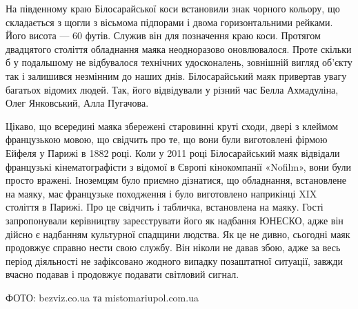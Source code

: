 На південному краю Білосарайської коси встановили знак чорного кольору, що
складається з щогли з вісьмома підпорами і двома горизонтальними рейками. Його
висота — 60 футів. Служив він для позначення краю коси. Протягом двадцятого
століття обладнання маяка неодноразово оновлювалося. Проте скільки б у
подальшому не відбувалося технічних удосконалень, зовнішній вигляд об'єкту так
і залишився незмінним до наших днів. Білосарайський маяк привертав увагу
багатьох відомих людей. Так, його відвідували у різний час Белла Ахмадуліна,
Олег Янковський, Алла Пугачова.

Цікаво, що всередині маяка збережені старовинні круті сходи, двері з клеймом
французькою мовою, що свідчить про те, що вони були виготовлені фірмою Ейфеля у
Парижі в 1882 році. Коли у 2011 році Білосарайський маяк відвідали французькі
кінематографісти з відомої в Європі кінокомпанії «Nofilm», вони були просто
вражені. Іноземцям було приємно дізнатися, що обладнання, встановлене на маяку,
має французьке походження і було виготовлено наприкінці XIX століття в Парижі.
Про це свідчить і табличка, встановлена на маяку. Гості запропонували
керівництву зареєструвати його як надбання ЮНЕСКО, адже він дійсно є надбанням
культурної спадщини людства. Як це не дивно, сьогодні маяк продовжує справно
нести свою службу. Він ніколи не давав збою, адже за весь період діяльності не
зафіксовано жодного випадку позаштатної ситуації, завжди вчасно подавав і
продовжує подавати світловий сигнал.

ФОТО: bezviz.co.ua та mistomariupol.com.ua
